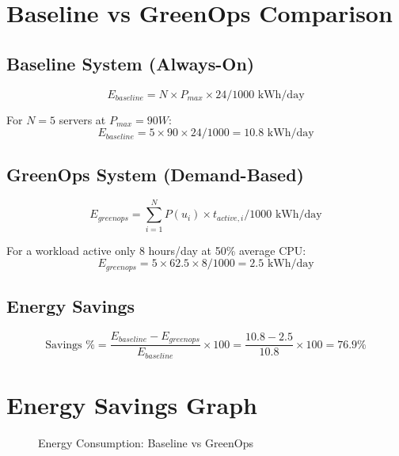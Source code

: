 \documentclass[12pt,a4paper]{report}
\begin{document}
\section{Baseline vs GreenOps Comparison}

\subsection{Baseline System (Always-On)}
\begin{equation}
E_{baseline} = N \times P_{max} \times 24 / 1000 \text{ kWh/day}
\end{equation}

For $N = 5$ servers at $P_{max} = 90W$:
$$E_{baseline} = 5 \times 90 \times 24 / 1000 = 10.8 \text{ kWh/day}$$

\subsection{GreenOps System (Demand-Based)}
\begin{equation}
E_{greenops} = \sum_{i=1}^{N} P(u_i) \times t_{active,i} / 1000 \text{ kWh/day}
\end{equation}

For a workload active only 8 hours/day at 50\% average CPU:
$$E_{greenops} = 5 \times 62.5 \times 8 / 1000 = 2.5 \text{ kWh/day}$$

\subsection{Energy Savings}
\begin{equation}
\text{Savings \%} = \frac{E_{baseline} - E_{greenops}}{E_{baseline}} \times 100 = \frac{10.8 - 2.5}{10.8} \times 100 = 76.9\%
\end{equation}

\section{Energy Savings Graph}

\begin{figure}[H]
\centering
{}
\caption{Energy Consumption: Baseline vs GreenOps}
\end{figure}
\end{document}
